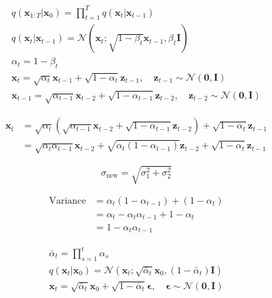 \documentclass[a4paper, 11pt]{article}
\begin{document}
\begin{gather*}
    q(\mathbf{x}_{1:T}|\mathbf{x}_0) = \prod_{t=1}^T q(\mathbf{x}_t|\mathbf{x}_{t-1}) \\[12pt]
    q(\mathbf{x}_t|\mathbf{x}_{t-1}) = \mathcal{N}(\mathbf{x}_t; \sqrt{1 - \beta_t}\mathbf{x}_{t-1}, \beta_t\mathbf{I}) \\[12pt]
    \alpha_t = 1 - \beta_t \\[12pt]
    \mathbf{x}_t = \sqrt{\alpha_t}\mathbf{x}_{t-1} + \sqrt{1 - \alpha_t}\mathbf{z}_{t-1}, \quad \mathbf{z}_{t-1} \sim \mathcal{N}(\mathbf{0}, \mathbf{I}) \\[12pt]
    \mathbf{x}_{t-1} = \sqrt{\alpha_{t-1}}\mathbf{x}_{t-2} + \sqrt{1 - \alpha_{t-1}}\mathbf{z}_{t-2}, \quad \mathbf{z}_{t-2} \sim \mathcal{N}(\mathbf{0}, \mathbf{I})
\end{gather*}

\begin{align*}
    \mathbf{x}_t &= \sqrt{\alpha_t} \left( \sqrt{\alpha_{t-1}}\mathbf{x}_{t-2} + \sqrt{1 - \alpha_{t-1}}\mathbf{z}_{t-2} \right) + \sqrt{1 - \alpha_t}\mathbf{z}_{t-1} \\
    &= \sqrt{\alpha_t \alpha_{t-1}}\mathbf{x}_{t-2} + \sqrt{\alpha_t(1 - \alpha_{t-1})}\mathbf{z}_{t-2} + \sqrt{1 - \alpha_t}\mathbf{z}_{t-1}
\end{align*}

\begin{equation*}
    \sigma_{\text{new}} = \sqrt{\sigma_1^2 + \sigma_2^2}
\end{equation*}

\begin{align*}
    \text{Variance} &= \alpha_t(1 - \alpha_{t-1}) + (1 - \alpha_t) \\
    &= \alpha_t - \alpha_t\alpha_{t-1} + 1 - \alpha_t \\
    &= 1 - \alpha_t\alpha_{t-1}
\end{align*}

\begin{gather*}
    \bar{\alpha}_t = \prod_{s=1}^t \alpha_s \\[12pt]
    q(\mathbf{x}_t|\mathbf{x}_0) = \mathcal{N}(\mathbf{x}_t; \sqrt{\bar{\alpha}_t}\mathbf{x}_0, (1 - \bar{\alpha}_t)\mathbf{I}) \\[12pt]
    \mathbf{x}_t = \sqrt{\bar{\alpha}_t}\mathbf{x}_0 + \sqrt{1 - \bar{\alpha}_t}\boldsymbol{\epsilon}, \quad \boldsymbol{\epsilon} \sim \mathcal{N}(\mathbf{0}, \mathbf{I})
\end{gather*}

\newpage
\end{document}

